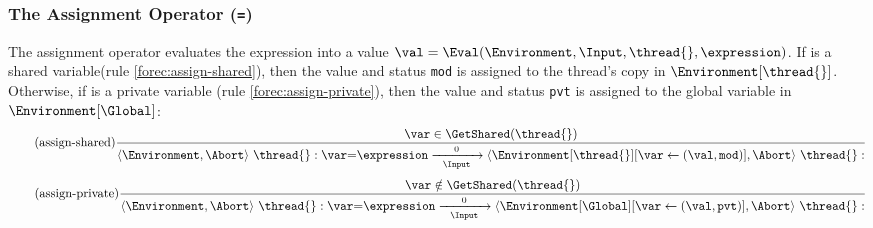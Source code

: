 \subsubsection{The Assignment Operator (\texttt{=})}
The assignment operator evaluates the expression
\expression{} into a value 
$\val = \Eval(\Environment, \Input, \thread{}, \expression)$.
If \var{} is a shared variable\footnotemark[4] (rule \ref{forec:assign-shared}), then the value \val{} and status \verb$mod$ 
is assigned to the thread's copy in $\Environment[\thread{}]$. 
Otherwise, if \var{} is a private variable (rule \ref{forec:assign-private}), then the value \val{}
and status \verb$pvt$ is assigned to the global variable in $\Environment[\Global]$:
\begin{equation*}
	\tag{assign-shared}
	\label{forec:assign-shared}
	\frac{
			\var \in \GetShared(\thread{})
		}{
			\langle \Environment, \Abort \rangle ~ \thread{}:\var \mathtt{=} \expression
				\xrightarrow[~~\Input~~]{0} 
			\langle \Environment[\thread{}][\var \gets (\val, \texttt{mod})], \Abort \rangle ~ \thread{}:
		}
\end{equation*}
\begin{equation*}
	\tag{assign-private}
	\label{forec:assign-private}
	\frac{
			\var \notin \GetShared(\thread{})
		}{
			\langle \Environment, \Abort \rangle ~ \thread{}:\var \mathtt{=} \expression
				\xrightarrow[~~\Input~~]{0} 
			\langle \Environment[\Global][\var \gets (\val, \texttt{pvt})], \Abort \rangle ~ \thread{}:
		}
\end{equation*}


